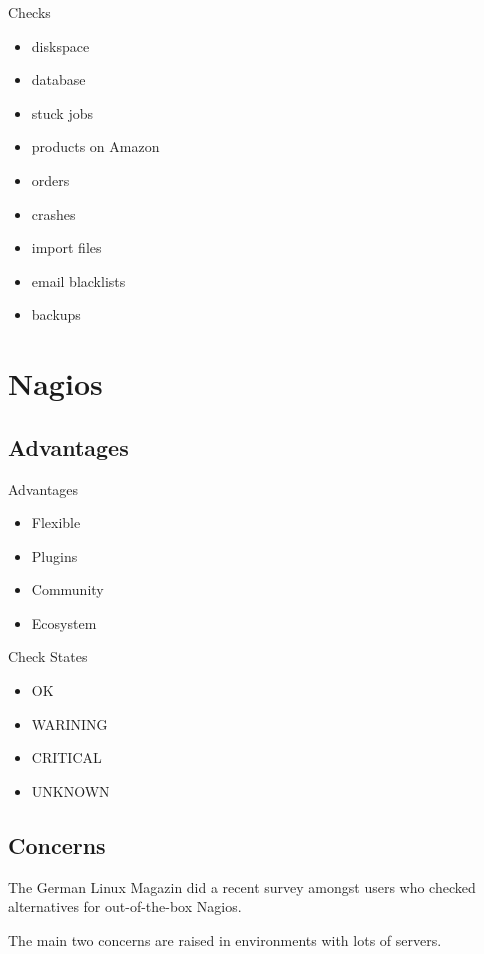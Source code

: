 \begin{frame}[fragile]{Checks}
\begin{itemize}
\item diskspace
\item database
\item stuck jobs
\item products on Amazon
\item orders
\item crashes
\item import files
\item email blacklists
\item backups
\end{itemize}
\end{frame}

\section{Nagios}

\subsection{Advantages}
\begin{frame}[fragile]{Advantages}
\begin{itemize}
\item Flexible
\item Plugins
\item Community
\item Ecosystem
\end{itemize}
\end{frame}

\begin{frame}[fragile]{Check States}
\begin{itemize}
\item OK
\item WARINING 
\item CRITICAL
\item UNKNOWN
\end{itemize}
\end{frame}

\subsection{Concerns}

The German Linux Magazin did a recent survey amongst users
who checked alternatives for out-of-the-box Nagios.

The main two concerns are raised in environments with lots
of servers.

